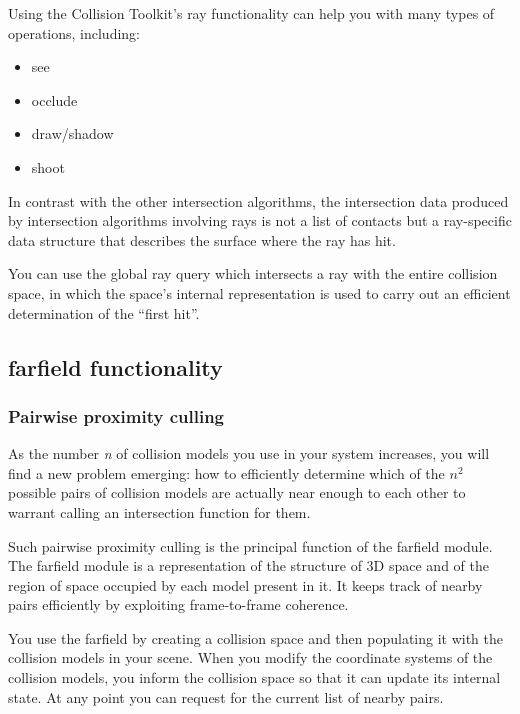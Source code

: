 \documentclass[11pt]{article}
\begin{document}
Using the Collision Toolkit's ray functionality can help you with many types of operations,
including:

\begin{itemize}
\item see
\item occlude
\item draw/shadow
\item shoot
\end{itemize}
 
In contrast with the other intersection algorithms, the intersection data
produced by intersection algorithms
involving rays is not a list of contacts but a ray-specific data structure
that describes the surface where the ray has hit. 

You can use the global ray query which intersects a ray with the entire
collision space, in which the space's internal representation is used to carry out an efficient determination of the ``first hit''.

\subsection{ farfield functionality } 

\subsubsection{ Pairwise proximity culling } 

As the number \emph{n} of collision models you use in your system
increases, you will find a new problem emerging: how to efficiently
determine which of the \(n^{2}\)
possible pairs of collision models are actually near enough to each other
to warrant calling an intersection function for them.

Such pairwise proximity culling is the principal function of the
farfield module. 
The farfield module is 
a representation of the structure of 3D space and of the region of space occupied by each model present in it.
It keeps track of nearby pairs efficiently by exploiting frame-to-frame
coherence. 

You use the farfield by creating a collision space and then populating it
with the collision models in your scene. When you modify the coordinate
systems of the collision models, you inform the collision space so that it
can update its internal state. At any point you can request for the current
list of nearby pairs.

\end{document}
